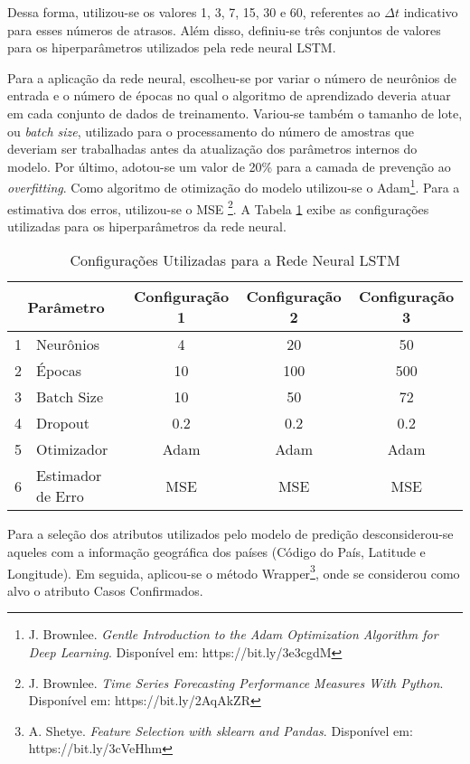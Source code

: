 \documentclass{ieeeaccess}
\begin{document}
Dessa forma, utilizou-se os valores 1, 3, 7, 15, 30 e 60, referentes ao $\Delta t$ indicativo para esses números de atrasos. Além disso, definiu-se três conjuntos de valores para os hiperparâmetros utilizados pela rede neural LSTM. 

Para a aplicação da rede neural, escolheu-se por variar o número de neurônios de entrada e o número de épocas no qual o algoritmo de aprendizado deveria atuar em cada conjunto de dados de treinamento. Variou-se também o tamanho de lote, ou \textit{batch size}, utilizado para o processamento do número de amostras que deveriam ser trabalhadas antes da atualização dos parâmetros internos do modelo. Por último, adotou-se um valor de 20\% para a camada de prevenção ao \textit{overfitting}. Como algoritmo de otimização do modelo utilizou-se o Adam\footnote{J. Brownlee. \textit{Gentle Introduction to the Adam Optimization Algorithm for Deep Learning}. Disponível em: https://bit.ly/3e3cgdM}. Para a estimativa dos erros, utilizou-se o MSE \footnote{J. Brownlee. \textit{Time Series Forecasting Performance Measures With Python}. Disponível em: https://bit.ly/2AqAkZR}. A Tabela \ref{tab4} exibe as configurações utilizadas para os hiperparâmetros da rede neural.

\begin{table}[!h]
	\caption{Configurações Utilizadas para a Rede Neural LSTM }
	\label{tab4}
	\setlength{\tabcolsep}{3pt}
	\setlength\extrarowheight{2.5pt}
	
	\centering
	\begin{tabular}{| c | l | c | c | c |}
		\hline
		\multicolumn{2}{|c|}{Parâmetro} &\multicolumn{1}{c|}{Configuração 1} & \multicolumn{1}{c|}{Configuração 2} & \multicolumn{1}{c|}{Configuração 3} \\ \hline
			
			1  & Neurônios & 4 &  20 & 50\\
			2 & Épocas & 10  & 100 & 500 \\
			3 & Batch Size & 10 &  50 & 72 \\
			4 & Dropout & 0.2 & 0.2 & 0.2\\
			5 & Otimizador & Adam & Adam & Adam\\
			6 & Estimador de Erro & MSE & MSE & MSE\\ \hline
			
		\end{tabular}
\end{table}

Para a seleção dos atributos utilizados pelo modelo de predição desconsiderou-se aqueles com a informação geográfica dos países (Código do País, Latitude e Longitude). Em seguida, aplicou-se o método Wrapper\footnote{A. Shetye. \textit{Feature Selection with sklearn and Pandas}. Disponível em: https://bit.ly/3cVeHhm}, onde se considerou como alvo o atributo Casos Confirmados. 
\end{document}
